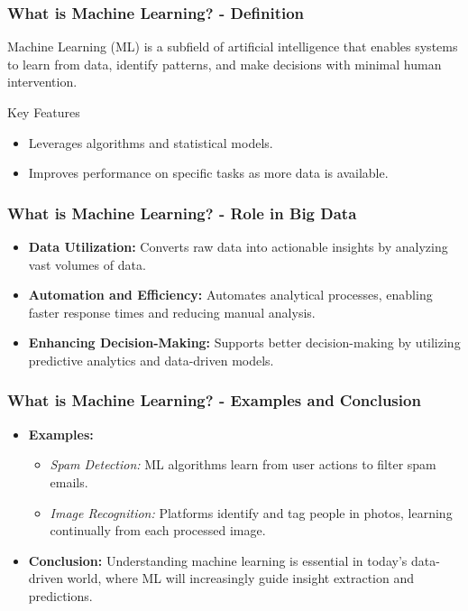 \documentclass[aspectratio=169]{beamer}
\begin{document}
\begin{frame}[fragile]
    \frametitle{What is Machine Learning? - Definition}
    Machine Learning (ML) is a subfield of artificial intelligence that enables systems to learn from data, identify patterns, and make decisions with minimal human intervention. 

    \begin{block}{Key Features}
        \begin{itemize}
            \item Leverages algorithms and statistical models.
            \item Improves performance on specific tasks as more data is available.
        \end{itemize}
    \end{block}
\end{frame}

\begin{frame}[fragile]
    \frametitle{What is Machine Learning? - Role in Big Data}
    \begin{itemize}
        \item \textbf{Data Utilization:} Converts raw data into actionable insights by analyzing vast volumes of data.
        \item \textbf{Automation and Efficiency:} Automates analytical processes, enabling faster response times and reducing manual analysis.
        \item \textbf{Enhancing Decision-Making:} Supports better decision-making by utilizing predictive analytics and data-driven models.
    \end{itemize}
\end{frame}

\begin{frame}[fragile]
    \frametitle{What is Machine Learning? - Examples and Conclusion}
    \begin{itemize}
        \item \textbf{Examples:}
            \begin{itemize}
                \item \textit{Spam Detection:} ML algorithms learn from user actions to filter spam emails.
                \item \textit{Image Recognition:} Platforms identify and tag people in photos, learning continually from each processed image.
            \end{itemize}
        \item \textbf{Conclusion:} Understanding machine learning is essential in today’s data-driven world, where ML will increasingly guide insight extraction and predictions.
    \end{itemize}
\end{frame}
\end{document}
